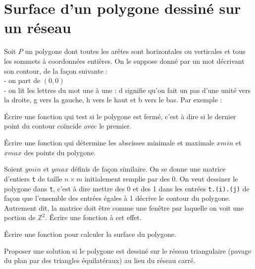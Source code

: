 \renewcommand{\SourceFile}{6-geometrie-et-images/src/6-2.ml}

\section{Surface d'un polygone dessiné sur un réseau}

Soit $P$ un polygone dont toutes les arêtes sont horizontales ou verticales et tous les sommets à coordonnées entières. On le suppose donné par un mot décrivant son contour, de la façon suivante :\\
- on part de $(0,0)$\\
- on lit les lettres du mot une à une : \og d \fg{} signifie qu'on fait un pas d'une unité vers la droite, \og g \fg{} vers la gauche, \og h \fg{} vers le haut et \og b \fg{} vers le bas. Par exemple :
\medskip

\begin{center}
\end{center}

\Q
Écrire une fonction qui test si le polygone est fermé, c'est à dire si le dernier point du contour coïncide avec le premier.
\newpage

\Q
Écrire une fonction qui détermine les abscisses minimale et maximale $xmin$ et $xmax$ des points du polygone.

\Q
Soient $ymin$ et $ymax$ définis de façon similaire. On se donne une matrice d'entiers \texttt{t} de taille $n \times m$ initialement remplie par des 0. On veut \og dessiner \fg{} le polygone dans \texttt{t}, c'est à dire mettre des 0 et des 1 dans les entrées \texttt{t.(i).(j)} de façon que l'ensemble des entrées égales à 1 décrive le contour du polygone. Autrement dit, la matrice doit être comme une \og fenêtre \fg{} par laquelle on voit une portion de $\mathbb{Z}^2$. Écrire une fonction à cet effet.

\Q
Écrire une fonction pour calculer la surface du polygone.

\Q
Proposer une solution si le polygone est dessiné sur le réseau triangulaire (pavage du plan par des triangles équilatéraux) au lieu du réseau carré.

